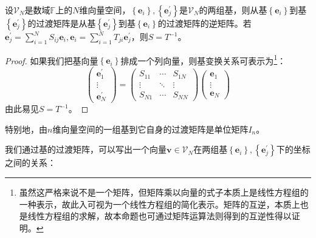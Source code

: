 \documentclass[main.tex]{subfiles}
\begin{document}
\begin{theorem}
设$\mathcal{V}_N$是数域$\mathbb{F}$上的$N$维向量空间，$\left\{\mathbf{e}_i\right\},\left\{\mathbf{e}^\prime_j\right\}$是$\mathcal{V}_N$的两组基，则从基$\left\{\mathbf{e}_i\right\}$到基$\left\{\mathbf{e}^\prime_j\right\}$的过渡矩阵是从基$\left\{\mathbf{e}^\prime_j\right\}$到基$\left\{\mathbf{e}_i\right\}$的过渡矩阵的逆矩阵。若$\mathbf{e}^\prime_j=\sum_{i=1}^NS_{ij}\mathbf{e}_i,\mathbf{e}_i=\sum_{i=1}^NT_{ji}\mathbf{e}^\prime_j$，则$S=T^{-1}$。
\end{theorem}
\begin{proof}
如果我们把基向量$\left\{\mathbf{e}_i\right\}$排成一个列向量，则基变换关系可表示为\footnote{虽然这严格来说不是一个矩阵，但矩阵乘以向量的式子本质上是线性方程组的一种表示，故此入可视为一个线性方程组的简化表示。矩阵的互逆，本质上也是线性方程组的求解，故本命题也可通过矩阵运算法则得到的互逆性得以证明。}：
\[
\left(\begin{array}{c}
\mathbf{e}^\prime_1\\
\vdots\\
\mathbf{e}^\prime_N
\end{array}\right)=\left(\begin{array}{ccc}
S_{11}&\cdots&S_{1N}\\
\vdots&\ddots&\vdots\\
S_{N1}&\cdots&S_{NN}
\end{array}\right)\left(\begin{array}{c}
\mathbf{e}_1\\
\vdots\\
\mathbf{e}_N
\end{array}\right)
\]
由此易见$S=T^{-1}$。
\end{proof}

特别地，由$n$维向量空间的一组基到它自身的过渡矩阵是单位矩阵$I_n$。

我们通过基的过渡矩阵，可以写出一个向量$\mathbf{v}\in\mathcal{V}_N$在两组基$\left\{\mathbf{e}_i\right\},\left\{\mathbf{e}^\prime_j\right\}$下的坐标之间的关系：
\end{document}
